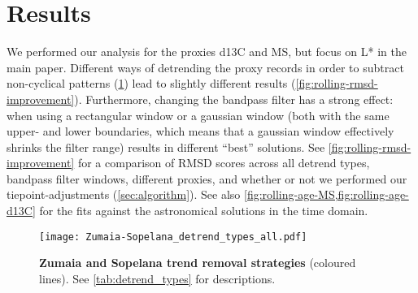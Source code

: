 \documentclass[draft]{agujournal2019}
\newcommand{\ijk}{\textcolor{violet}}
\begin{document}
\section{Results}\label{sec:results}


We performed our analysis for the proxies \gls{d13C} and \gls{MS}, but  focus on \gls{L*} in the main paper.
Different ways of detrending the proxy records in order to subtract non-cyclical patterns (\cref{fig:detrend}) lead to slightly different results (\cref{fig:rolling-rmsd-improvement}).
Furthermore, changing the bandpass filter has a strong effect: when using a rectangular window or a gaussian window (both with the same upper- and lower boundaries, which means that a gaussian window effectively shrinks the filter range) results in different ``best'' solutions.
See \cref{fig:rolling-rmsd-improvement} for a comparison of \gls{RMSD} scores across all detrend types, bandpass filter windows, different proxies, and whether or not we performed our tiepoint-adjustments (\cref{sec:algorithm}).
See also \cref{fig:rolling-age-MS,fig:rolling-age-d13C} for the fits against the astronomical solutions in the time domain.

\begin{figure}[htbp]
  \centering
  \texttt{[image: Zumaia-Sopelana\_detrend\_types\_all.pdf]}
  \caption{\label{fig:detrend}
    \textbf{Zumaia and Sopelana trend removal strategies} (coloured lines).
    See \cref{tab:detrend_types} for descriptions.
    }
\end{figure}

\end{document}
